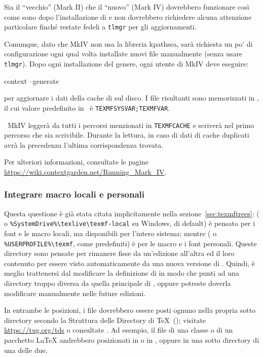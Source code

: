\documentclass{article}
\begin{document}
Sia il ``vecchio'' \ConTeXt{} (Mark II) che il ``nuovo'' \ConTeXt{}
(Mark IV) dovrebbero funzionare così come sono dopo l'installazione
di \TL{} e non dovrebbero richiedere alcuna attenzione particolare finché
restate fedeli a \verb+tlmgr+ per gli aggiornamenti.

Comunque, dato che \ConTeXt{} MkIV non usa la libreria kpathsea,
sarà richiesta un po' di configurazione ogni qual volta installate nuovi
file manualmente (senza usare \verb+tlmgr+). Dopo ogni installazione del
genere, ogni utente di MkIV deve eseguire:
\begin{sverbatim}
context --generate
\end{sverbatim}
per aggiornare  i dati della cache di \ConTeXt{} sul disco.
I file risultanti sono memorizzati in , il cui valore
predefinito in \TL\ è \verb+TEXMFSYSVAR;TEXMFVAR+.

\ConTeXt\ MkIV leggerà da tutti i percorsi menzionati in
\verb+TEXMFCACHE+ e scriverà nel primo percorso che sia scrivibile. Durante
la lettura, in caso di dati di cache duplicati avrà la precedenza l'ultima
corrispondenza trovata.

Per ulteriori informazioni, consultate le pagine
\url{https://wiki.contextgarden.net/Running_Mark_IV}.


\subsubsection{Integrare macro locali e personali}
\label{sec:local-personal-macros}

Questa questione è già stata citata implicitamente nella
sezione~\ref{sec:texmftrees}:
 ( o
\verb|%SystemDrive%\texlive\texmf-local| su Windows, di default) è pensato
per i font e le macro locali, ma disponibili per l'intero sistema; mentre
 ( o \verb|%USERPROFILE%\texmf|,
come predefiniti) è per le macro e i font personali.
Queste directory sono pensate per rimanere fisse da un'edizione all'altra
ed il loro contenuto per essere visto automaticamente da una nuova versione di 
\TL.
Quindi, è meglio trattenersi dal modificare la definizione di
 in modo che punti ad una directory troppo diversa da
quella principale di \TL, oppure potreste doverla modificare manualmente
nelle future edizioni.

In entrambe le posizioni, i file dovrebbero essere posti ognuno nella
propria sotto directory secondo la Struttura delle Directory di \TeX\
(\TDS); visitate \url{https://tug.org/tds} o consultate
. Ad esempio, il file di una
classe o di un pacchetto \LaTeX{} andrebbero posizionati in
 o in , oppure
in una sotto directory di una delle due.
\end{document}
